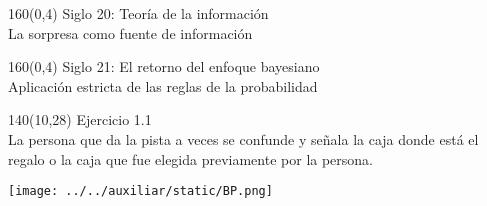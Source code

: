 \documentclass[shownotes,aspectratio=169]{beamer}
\begin{document}
\begin{frame}[plain]
\begin{textblock}{160}(0,4)
\centering \LARGE Siglo 20: Teoría de la información\\
\large La sorpresa como fuente de información
\end{textblock}


\end{frame}


\begin{frame}[plain]
\begin{textblock}{160}(0,4)
\centering \LARGE Siglo 21: El retorno del enfoque bayesiano\\
\large Aplicación estricta de las reglas de la probabilidad
\end{textblock}


\end{frame}

\begin{frame}[plain]


\begin{textblock}{140}(10,28)
\Large Ejercicio 1.1 \\[0.4cm]

\large La persona que da la pista a veces se confunde y señala la caja donde está el regalo o la caja que fue elegida previamente por la persona. \\[0.2cm]


\end{textblock}


\end{frame}

\begin{frame}
\centering \vspace{0.5cm}
\texttt{[image: ../../auxiliar/static/BP.png]}
\end{frame}





%
%
\end{document}
